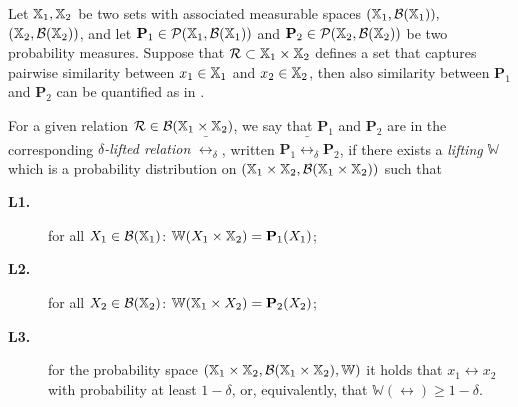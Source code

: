 \documentclass{ifacconf}
\begin{document}
Let ${\mathbb{X}}_1,{\mathbb{X}}_2$ be two sets with associated measurable spaces $({\mathbb{X}}_1,\mathcal B({\mathbb{X}}_1)),$ $({\mathbb{X}}_2,\mathcal B({\mathbb{X}}_2))$, and let $\mathbf{P}_1 \in \mathcal{P}({\mathbb{X}}_1,\mathcal B({\mathbb{X}}_1)) $ and $\mathbf{P}_2 \in \mathcal{P}({\mathbb{X}}_2,\mathcal B({\mathbb{X}}_2)) $ be two probability measures. Suppose that $\mathcal{R} \subset {\mathbb{X}}_1 \times {\mathbb{X}}_2$ defines a set that captures pairwise similarity between $x_1 \in {\mathbb{X}}_1$ and $x_2 \in {\mathbb{X}}_2$, then also similarity between $\mathbf{P}_1$ and $\mathbf{P}_2$ can be quantified as in \cite{haesaert2017verification}.
%
\begin{definition}
\label{def:dellifting}
  For a given relation $\mathcal{R}\in \mathcal B({\mathbb{X}}_1\times {\mathbb{X}}_2)$, we say that  $\mathbf{P}_1$ and $\mathbf{P}_2$ are in the corresponding \emph{$\delta$-lifted relation} $\bar \rel_\delta$, written $\mathbf{P}_1 \bar \rel_\delta \mathbf{P}_2$, if there exists a \emph{lifting} $\mathbb{W}$ which is a probability distribution on $({\mathbb{X}}_1\times {\mathbb{X}}_2,\mathcal B({\mathbb{X}}_1\times {\mathbb{X}}_2))$ such that { \setlength{\parskip}{-1pt}\setlength{\parsep}{0pt}
		\begin{description}
			\item[\textbf{L1.}] for all $X_1\in \mathcal{B}({\mathbb{X}}_1)$: $\mathbb W(X_1\times {\mathbb{X}}_2)=\mathbf{P}_1(X_1)$;
			\item [\textbf{L2.}] for all $X_2\in \mathcal{B}({\mathbb{X}}_2)$:  $\mathbb W({\mathbb{X}}_1\times X_2)=\mathbf{P}_2(X_2)$;
			\item[\textbf{L3.}] for the probability space  $({\mathbb{X}}_1\times {\mathbb{X}}_2,\mathcal B({\mathbb{X}}_1\times {\mathbb{X}}_2), \mathbb W)$ it holds that
			$x_1\rel x_2$ with probability at least $1-\delta$, or, equivalently, that $\mathbb{W}\left(\rel\right)\geq1-\delta$.
	\end{description}}
\end{definition}
\end{document}
